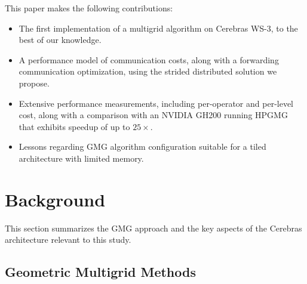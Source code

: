 \documentclass[conference]{IEEEtran}
\begin{document}

        This paper makes the following contributions:
        \begin{itemize}
            \item The first implementation of a multigrid algorithm on Cerebras WS-3, to the best of our knowledge.
            \item A performance model of communication costs, along with a forwarding communication optimization, using the strided distributed solution we propose.
            \item Extensive performance measurements, including per-operator and per-level cost, along with a comparison with an NVIDIA GH200 running HPGMG that exhibits speedup of up to \(25\times\).
            \item Lessons regarding GMG algorithm configuration suitable for a tiled architecture with limited memory.
        \end{itemize}

    \section{Background}
        This section summarizes the GMG approach and the key aspects of the Cerebras architecture relevant to this study.

        \subsection{Geometric Multigrid Methods}
\end{document}
